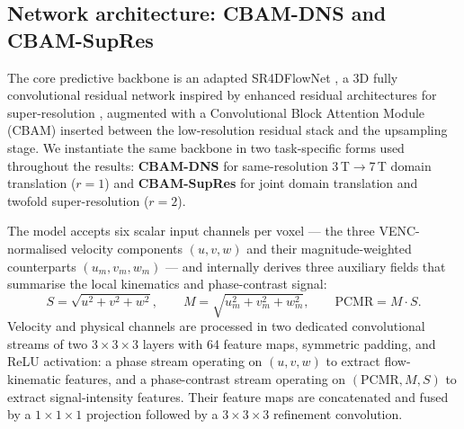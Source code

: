 \documentclass[11pt]{article}
\begin{document}
\subsection*{Network architecture: CBAM-DNS and CBAM-SupRes}

The core predictive backbone is an adapted SR4DFlowNet
\cite{ferdian2020,elahmar2023}, a 3D fully convolutional residual
network inspired by enhanced residual architectures for super-resolution
\cite{lim2017edsr}, augmented with a Convolutional Block Attention
Module (CBAM) \cite{woo2018cbam} inserted between the low-resolution
residual stack and the upsampling stage. We instantiate the same
backbone in two task-specific forms used throughout the results:
\textbf{CBAM-DNS} for same-resolution 3\,T$\to$7\,T domain translation
($r=1$) and \textbf{CBAM-SupRes} for joint domain translation and
twofold super-resolution ($r=2$).

The model accepts six scalar input channels per voxel --- the three
VENC-normalised velocity components $(u, v, w)$ and their
magnitude-weighted counterparts $(u_m, v_m, w_m)$ --- and internally
derives three auxiliary fields that summarise the local kinematics and
phase-contrast signal:
\begin{equation}
    S = \sqrt{u^{2}+v^{2}+w^{2}},
    \qquad
    M = \sqrt{u_m^{2}+v_m^{2}+w_m^{2}},
    \qquad
    \mathrm{PCMR} = M \cdot S.
\end{equation}
Velocity and physical channels are processed in two dedicated
convolutional streams of two $3{\times}3{\times}3$ layers with 64
feature maps, symmetric padding, and ReLU activation: a phase stream
operating on $(u,v,w)$ to extract flow-kinematic features, and a
phase-contrast stream operating on $(\mathrm{PCMR}, M, S)$ to extract
signal-intensity features. Their feature maps are concatenated and
fused by a $1{\times}1{\times}1$ projection followed by a
$3{\times}3{\times}3$ refinement convolution.
\end{document}
